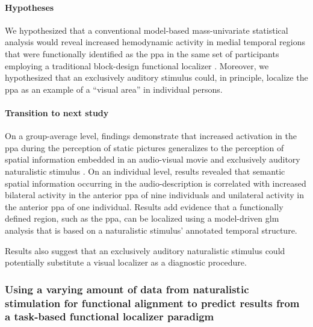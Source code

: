 \paragraph{Hypotheses}

We hypothesized that a conventional model-based mass-univariate statistical
analysis would reveal increased hemodynamic activity in medial temporal regions
that were functionally identified as the \ac{ppa} in the same set of
participants employing a traditional block-design functional localizer
\citep{sengupta2016extension}.
Moreover, we hypothesized that an exclusively auditory stimulus could, in
principle, localize the \ac{ppa} as an example of a ``visual area'' in
individual persons.


\paragraph{Transition to next study}



On a group-average level, findings demonstrate that increased activation in the
\ac{ppa} during the perception of static pictures generalizes to the perception
of spatial information embedded in an audio-visual movie and exclusively
auditory naturalistic stimulus \citep{haeusler2022processing}.
On an individual level, results revealed that semantic spatial information
occurring in the audio-description is correlated with increased bilateral
activity in the anterior \ac{ppa} of nine individuals and unilateral activity in
the anterior \ac{ppa} of one individual.
Results add evidence \citep[cf.][]{bartels2004mapping} that a functionally
defined region, such as the \ac{ppa}, can be localized using a model-driven
\ac{glm} analysis that is based on a naturalistic stimulus' annotated temporal
structure.


Results also suggest that an exclusively auditory naturalistic stimulus could
potentially substitute a visual localizer as a diagnostic procedure.



\subsubsection{Using a varying amount of data from naturalistic stimulation for
functional alignment to predict results from a task-based functional localizer
paradigm}

